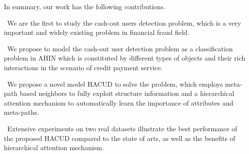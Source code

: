 In summary, our work has the following contributions. 

\textbullet \  We are the first to study the cash-out users detection problem, which is a very important and widely existing problem in financial fraud field. 

\textbullet \  We propose to model the cash-out user detection problem as a classification problem in AHIN which is constituted by different types of objects and their rich interactions in the scenario
of credit payment service.

\textbullet \  We propose a novel model HACUD to solve the problem, which employs meta-path based neighbors to fully exploit structure information and a hierarchical attention mechanism to automatically learn the importance of attributes and meta-paths. 

\textbullet \  Extensive experiments on two real datasets illustrate the best performance of the proposed HACUD compared to the state of arts, as well as the benefits of hierarchical attention mechanism.
      
